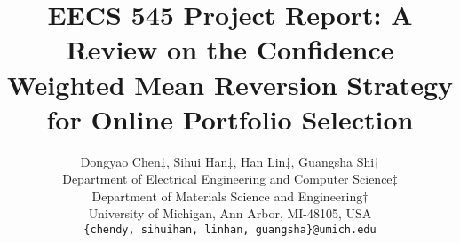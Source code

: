 \documentclass{article} %
\title{EECS 545 Project Report: A Review on the Confidence Weighted Mean Reversion Strategy for Online Portfolio Selection}
\author{
Dongyao Chen$\ddagger$, Sihui Han$\ddagger$, Han Lin$\ddagger$, Guangsha Shi$\dagger$\\
Department of Electrical Engineering and Computer Science$\ddagger$\\
Department of Materials Science and Engineering$\dagger$\\
University of Michigan, Ann Arbor, MI-48105, USA\\
\texttt{\{chendy, sihuihan, linhan, guangsha\}@umich.edu}
}
\begin{document}
\maketitle







\small

\normalsize
\end{document}

